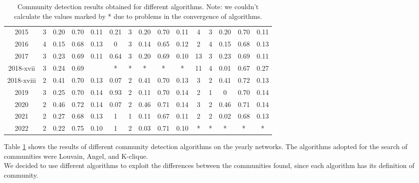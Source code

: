 \begin{table}[h]
\begin{tabular}{c|cccc|ccccc|ccccc|}
\multicolumn{1}{|c|}{2015}       & 3     & 0.20     & 0.70     & 0.11    & 0.21   & 3  & 0.20  & 0.70  & 0.11  & 4     & 3   & 0.20   & 0.70   & 0.11   \\
\multicolumn{1}{|c|}{2016}       & 4     & 0.15     & 0.68     & 0.13    & 0      & 3  & 0.14  & 0.65  & 0.12  & 2     & 4   & 0.15   & 0.68   & 0.13   \\
\multicolumn{1}{|c|}{2017}       & 3     & 0.23     & 0.69     & 0.11    & 0.64   & 3  & 0.20  & 0.69  & 0.10  & 13    & 3   & 0.23   & 0.69   & 0.11   \\
\multicolumn{1}{|c|}{2018-xvii}  & 3     & 0.24     & 0.69     &         & *      & *  & *     & *     & *     & 11    & 4   & 0.01   & 0.67   & 0.27   \\
\multicolumn{1}{|c|}{2018-xviii} & 2     & 0.41     & 0.70     & 0.13    & 0.07   & 2  & 0.41  & 0.70  & 0.13  & 3     & 2   & 0.41   & 0.72   & 0.13   \\
\multicolumn{1}{|c|}{2019}       & 3     & 0.25     & 0.70     & 0.14    & 0.93   & 2  & 0.11  & 0.70  & 0.14  & 2     & 1   & 0      & 0.70   & 0.14   \\
\multicolumn{1}{|c|}{2020}       & 2     & 0.46     & 0.72     & 0.14    & 0.07   & 2  & 0.46  & 0.71  & 0.14  & 3     & 2   & 0.46   & 0.71   & 0.14   \\
\multicolumn{1}{|c|}{2021}       & 2     & 0.27     & 0.68     & 0.13    & 1      & 1  & 0.11  & 0.67  & 0.11  & 2     & 2   & 0.02   & 0.68   & 0.13   \\
\multicolumn{1}{|c|}{2022}       & 2     & 0.22     & 0.75     & 0.10    & 1   & 2  & 0.03  & 0.71 & 0.10  & *     & *   & *      & *      & *      \\ \hline
\end{tabular}
\caption{Community detection results obtained for different algorithms. Note: we couldn't calculate the values marked by * due to problems in the convergence of algorithms.}
\label{tab:community}
\end{table}


Table \ref{tab:community} shows the results of different community detection algorithms on the yearly networks. The algorithms adopted for the search of communities were Louvain, Angel, and K-clique.\\

We decided to use different algorithms to exploit the differences between the communities found, since each algorithm has its definition of community.\\

